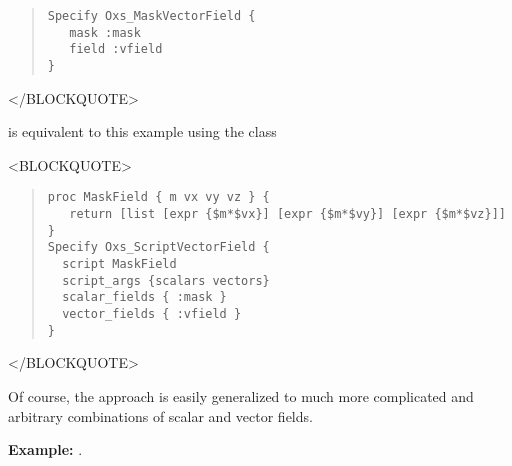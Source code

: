 \begin{description}
\begin{quote}
\begin{verbatim}
Specify Oxs_MaskVectorField {
   mask :mask
   field :vfield
}\end{verbatim}
\end{quote}
\begin{rawhtml}</BLOCKQUOTE>\end{rawhtml}
is equivalent to this example using the 
class
\begin{rawhtml}<BLOCKQUOTE>\end{rawhtml}
\begin{quote}
\begin{verbatim}
proc MaskField { m vx vy vz } {
   return [list [expr {$m*$vx}] [expr {$m*$vy}] [expr {$m*$vz}]]
}
Specify Oxs_ScriptVectorField {
  script MaskField
  script_args {scalars vectors}
  scalar_fields { :mask }
  vector_fields { :vfield }
}\end{verbatim}
\end{quote}
\begin{rawhtml}</BLOCKQUOTE>\end{rawhtml}
Of course, the  approach is easily
generalized to much more complicated and arbitrary combinations of
scalar and vector fields.

\textbf{Example:} .


\end{description}
